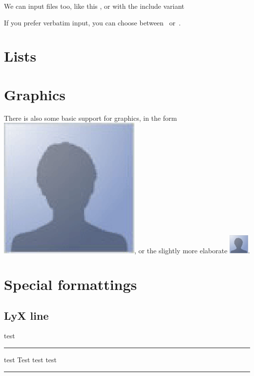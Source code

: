 \documentclass[a4paper,12pt]{article}
\newcommand{\lyxline}[1][1pt]{%
  \par\noindent%
  \rule[.5ex]{\linewidth}{#1}\par}
\begin{document}
We can input files too, like this , or with the include
variant 

If you prefer verbatim input, you can choose
between~ or~.

\section{Lists}

\listoffigures
\listoftables

\section{Graphics}

There is also some basic support for graphics, in the form
\includegraphics{foo.eps}, or the slightly more elaborate
\includegraphics[bb=10bp 0bp 96bp 96bp,clip,height=1cm, width=1cm]{foo.eps}.

\section{Special formattings}

\subsection{LyX line}

test

{\tiny \lyxline{\tiny}}{\tiny \par}

test {\Huge Test} {\tiny test} test

\lyxline{\normalsize}
\end{document}
